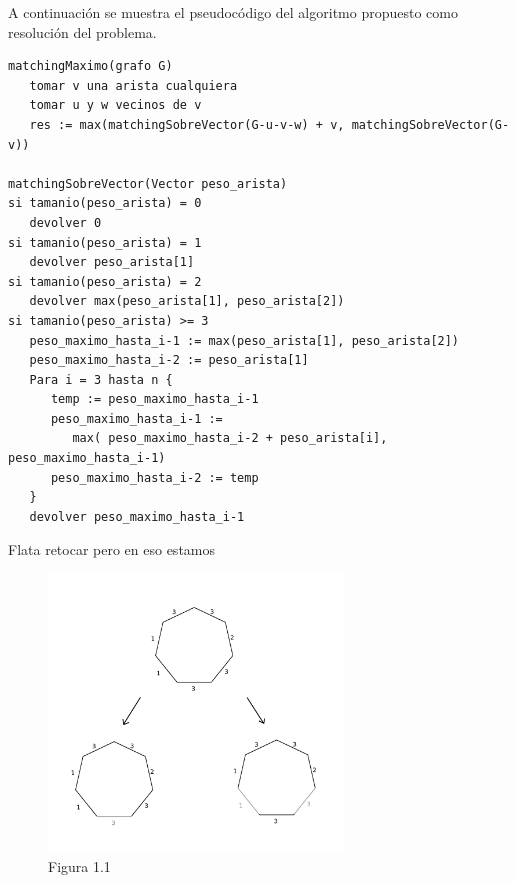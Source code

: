\documentclass[a4paper, 12pt]{article}
\begin{document}
A continuaci\'on se muestra el pseudoc\'odigo del algoritmo propuesto como resoluci\'on del problema.


\begin{verbatim}
matchingMaximo(grafo G)
   tomar v una arista cualquiera
   tomar u y w vecinos de v
   res := max(matchingSobreVector(G-u-v-w) + v, matchingSobreVector(G-v))

matchingSobreVector(Vector peso_arista)
si tamanio(peso_arista) = 0
   devolver 0
si tamanio(peso_arista) = 1
   devolver peso_arista[1]
si tamanio(peso_arista) = 2
   devolver max(peso_arista[1], peso_arista[2])
si tamanio(peso_arista) >= 3
   peso_maximo_hasta_i-1 := max(peso_arista[1], peso_arista[2]) 
   peso_maximo_hasta_i-2 := peso_arista[1]
   Para i = 3 hasta n {
      temp := peso_maximo_hasta_i-1
      peso_maximo_hasta_i-1 := 
         max( peso_maximo_hasta_i-2 + peso_arista[i], peso_maximo_hasta_i-1)
      peso_maximo_hasta_i-2 := temp
   }
   devolver peso_maximo_hasta_i-1

\end{verbatim}

Flata retocar pero en eso estamos
\begin{figure}[H]
\begin{center}
\includegraphics[width=0.7\textwidth]{imagenes/paso1y2.png}
\caption{Figura 1.1}
\end{center}
\end{figure}
\end{document}
